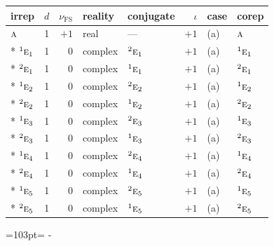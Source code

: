 \documentclass[10pt,a4paper]{article}
\newcommand{\needspace}[1]{\par\penalty-100\begingroup\dimen0=#1\relax\dimen2=\pagegoal
  \advance\dimen2-\pagetotal\ifdim\dimen0>\dimen2\relax\ifdim\dimen2>0pt\vfil\break\fi\fi
  \endgroup}
\numberwithin{equation}{section}
\newcommand{\irr}[1]{\text{\normalfont\scshape #1}}
\newcommand{\conjpair}[1]{{}^{#1}}
\newcommand{\fsind}{\nu_{\mathrm{FS}}}
\begin{document}
{\small\renewcommand{\arraystretch}{1.25}\setlength{\tabcolsep}{4pt}\begin{longtable}{@{}lrrllrll@{}}\toprule
irrep & $d$ & $\fsind$ & reality & conjugate & $\iota$ & case & corep\\\midrule\endhead
\bottomrule\endfoot\endlastfoot
$\irr{a}$ & 1 & $+1$ & real & --- & $+1$ & (a) & $\irr{a}$\\*
$\conjpair{1}\irr{e}_{1}$ & 1 & $0$ & complex & $\conjpair{2}\irr{e}_{1}$ & $+1$ & (a) & $\conjpair{1}\irr{e}_{1}$\\*
$\conjpair{2}\irr{e}_{1}$ & 1 & $0$ & complex & $\conjpair{1}\irr{e}_{1}$ & $+1$ & (a) & $\conjpair{2}\irr{e}_{1}$\\*
$\conjpair{1}\irr{e}_{2}$ & 1 & $0$ & complex & $\conjpair{2}\irr{e}_{2}$ & $+1$ & (a) & $\conjpair{1}\irr{e}_{2}$\\*
$\conjpair{2}\irr{e}_{2}$ & 1 & $0$ & complex & $\conjpair{1}\irr{e}_{2}$ & $+1$ & (a) & $\conjpair{2}\irr{e}_{2}$\\*
$\conjpair{1}\irr{e}_{3}$ & 1 & $0$ & complex & $\conjpair{2}\irr{e}_{3}$ & $+1$ & (a) & $\conjpair{1}\irr{e}_{3}$\\*
$\conjpair{2}\irr{e}_{3}$ & 1 & $0$ & complex & $\conjpair{1}\irr{e}_{3}$ & $+1$ & (a) & $\conjpair{2}\irr{e}_{3}$\\*
$\conjpair{1}\irr{e}_{4}$ & 1 & $0$ & complex & $\conjpair{2}\irr{e}_{4}$ & $+1$ & (a) & $\conjpair{1}\irr{e}_{4}$\\*
$\conjpair{2}\irr{e}_{4}$ & 1 & $0$ & complex & $\conjpair{1}\irr{e}_{4}$ & $+1$ & (a) & $\conjpair{2}\irr{e}_{4}$\\*
$\conjpair{1}\irr{e}_{5}$ & 1 & $0$ & complex & $\conjpair{2}\irr{e}_{5}$ & $+1$ & (a) & $\conjpair{1}\irr{e}_{5}$\\*
$\conjpair{2}\irr{e}_{5}$ & 1 & $0$ & complex & $\conjpair{1}\irr{e}_{5}$ & $+1$ & (a) & $\conjpair{2}\irr{e}_{5}$\\
\bottomrule\end{longtable}}
\needspace{103pt}
\end{document}
